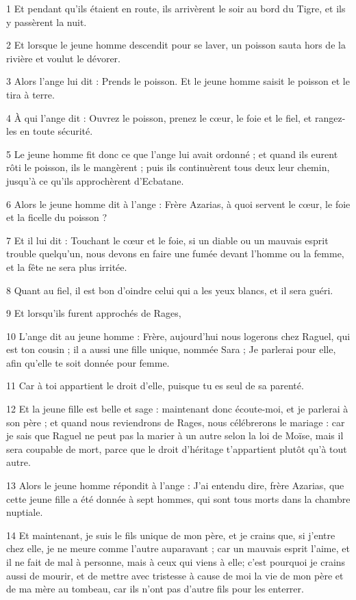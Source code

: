 \par 1 Et pendant qu'ils étaient en route, ils arrivèrent le soir au bord du Tigre, et ils y passèrent la nuit.
\par 2 Et lorsque le jeune homme descendit pour se laver, un poisson sauta hors de la rivière et voulut le dévorer.
\par 3 Alors l'ange lui dit : Prends le poisson. Et le jeune homme saisit le poisson et le tira à terre.
\par 4 À qui l'ange dit : Ouvrez le poisson, prenez le cœur, le foie et le fiel, et rangez-les en toute sécurité.
\par 5 Le jeune homme fit donc ce que l'ange lui avait ordonné ; et quand ils eurent rôti le poisson, ils le mangèrent ; puis ils continuèrent tous deux leur chemin, jusqu'à ce qu'ils approchèrent d'Ecbatane.
\par 6 Alors le jeune homme dit à l'ange : Frère Azarias, à quoi servent le cœur, le foie et la ficelle du poisson ?
\par 7 Et il lui dit : Touchant le cœur et le foie, si un diable ou un mauvais esprit trouble quelqu'un, nous devons en faire une fumée devant l'homme ou la femme, et la fête ne sera plus irritée.
\par 8 Quant au fiel, il est bon d'oindre celui qui a les yeux blancs, et il sera guéri.
\par 9 Et lorsqu'ils furent approchés de Rages,
\par 10 L'ange dit au jeune homme : Frère, aujourd'hui nous logerons chez Raguel, qui est ton cousin ; il a aussi une fille unique, nommée Sara ; Je parlerai pour elle, afin qu'elle te soit donnée pour femme.
\par 11 Car à toi appartient le droit d'elle, puisque tu es seul de sa parenté.
\par 12 Et la jeune fille est belle et sage : maintenant donc écoute-moi, et je parlerai à son père ; et quand nous reviendrons de Rages, nous célébrerons le mariage : car je sais que Raguel ne peut pas la marier à un autre selon la loi de Moïse, mais il sera coupable de mort, parce que le droit d'héritage t'appartient plutôt qu'à tout autre.
\par 13 Alors le jeune homme répondit à l'ange : J'ai entendu dire, frère Azarias, que cette jeune fille a été donnée à sept hommes, qui sont tous morts dans la chambre nuptiale.
\par 14 Et maintenant, je suis le fils unique de mon père, et je crains que, si j'entre chez elle, je ne meure comme l'autre auparavant ; car un mauvais esprit l'aime, et il ne fait de mal à personne, mais à ceux qui viens à elle; c'est pourquoi je crains aussi de mourir, et de mettre avec tristesse à cause de moi la vie de mon père et de ma mère au tombeau, car ils n'ont pas d'autre fils pour les enterrer.
